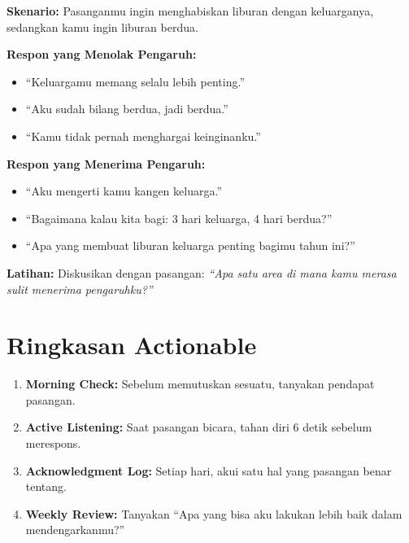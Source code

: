 \begin{exercisebox}
\textbf{Skenario:} Pasanganmu ingin menghabiskan liburan dengan keluarganya, sedangkan kamu ingin liburan berdua.

\textbf{Respon yang Menolak Pengaruh:}
\begin{itemize}
    \item[$\square$] ``Keluargamu memang selalu lebih penting.''
    \item[$\square$] ``Aku sudah bilang berdua, jadi berdua.''
    \item[$\square$] ``Kamu tidak pernah menghargai keinginanku.''
\end{itemize}

\textbf{Respon yang Menerima Pengaruh:}
\begin{itemize}
    \item[$\square$] ``Aku mengerti kamu kangen keluarga.''
    \item[$\square$] ``Bagaimana kalau kita bagi: 3 hari keluarga, 4 hari berdua?''
    \item[$\square$] ``Apa yang membuat liburan keluarga penting bagimu tahun ini?''
\end{itemize}

\textbf{Latihan:} Diskusikan dengan pasangan: \textit{``Apa satu area di mana kamu merasa sulit menerima pengaruhku?''}
\end{exercisebox}

\section{Ringkasan Actionable}

\begin{tipbox}
\begin{enumerate}
    \item \textbf{Morning Check:} Sebelum memutuskan sesuatu, tanyakan pendapat pasangan.
    \item \textbf{Active Listening:} Saat pasangan bicara, tahan diri 6 detik sebelum merespons.
    \item \textbf{Acknowledgment Log:} Setiap hari, akui satu hal yang pasangan benar tentang.
    \item \textbf{Weekly Review:} Tanyakan ``Apa yang bisa aku lakukan lebih baik dalam mendengarkanmu?''
\end{enumerate}
\end{tipbox}

